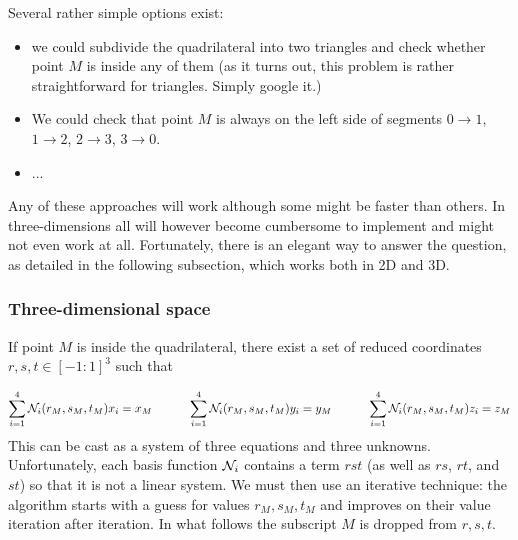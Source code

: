 \noindent Several rather simple options exist:
\begin{itemize}
\item we could subdivide the quadrilateral into two triangles and check whether point $M$ is inside any of them (as it turns out, this problem is rather straightforward for triangles. Simply google it.)
\item We could check that point $M$ is always on the left side of segments $0\rightarrow 1$, $1\rightarrow 2$, $2\rightarrow 3$, $3\rightarrow 0$.
\item ...  
\end{itemize}

Any of these approaches will work although some might be faster than others. 
In three-dimensions all will however become 
cumbersome to implement and might not even work at all. 
Fortunately, there is an elegant way to answer the question, as 
detailed in the following subsection, which works both in 2D and 3D.

\subsubsection{Three-dimensional space}

If point $M$ is inside the quadrilateral, there exist a set of reduced 
coordinates $r,s,t\in[-1:1]^3$ such that 

\[
\sum_{i=1}^4 {\mathcal{N}}_i(r_M,s_M,t_M) x_i = x_M
\quad\quad\quad
\sum_{i=1}^4 {\mathcal{N}}_i(r_M,s_M,t_M) y_i = y_M
\quad\quad\quad
\sum_{i=1}^4 {\mathcal{N}}_i(r_M,s_M,t_M) z_i = z_M
\]
This can be cast as a system of three equations and three unknowns. 
Unfortunately, each basis function ${\mathcal{N}}_i$ 
contains a term $rst$ (as well as $rs$, $rt$, and $st$) 
so that it is not a linear system.
We must then use an iterative technique: the algorithm starts with 
a guess for values $r_M,s_M,t_M$ and 
improves on their value iteration after iteration. 
In what follows the subscript $M$ is dropped from $r,s,t$.

